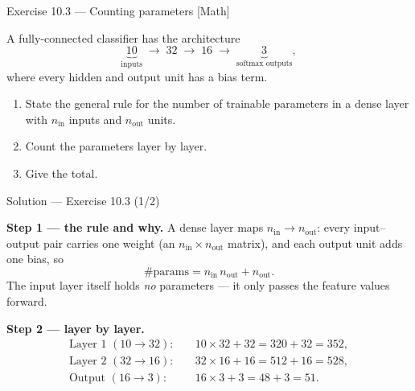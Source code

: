 \documentclass[aspectratio=169,11pt]{beamer}
\begin{document}
\begin{frame}{Exercise 10.3 --- Counting parameters [Math]}
\begin{exercise}
  A fully-connected classifier has the architecture
  \[
    \underbrace{10}_{\text{inputs}}
    \;\rightarrow\; 32 \;\rightarrow\; 16
    \;\rightarrow\; \underbrace{3}_{\text{softmax outputs}},
  \]
  where every hidden and output unit has a bias term.
  \begin{enumerate}
    \item State the general rule for the number of trainable
          parameters in a dense layer with $n_{\text{in}}$ inputs and
          $n_{\text{out}}$ units.
    \item Count the parameters layer by layer.
    \item Give the total.
  \end{enumerate}
\end{exercise}
\end{frame}

\begin{frame}{Solution --- Exercise 10.3 (1/2)}
\begin{solutionbox}
  \textbf{Step 1 --- the rule and why.} A dense layer maps
  $n_{\text{in}} \to n_{\text{out}}$: every input--output pair carries one
  weight (an $n_{\text{in}} \times n_{\text{out}}$ matrix), and each output
  unit adds one bias, so
  \[
    \#\text{params} = n_{\text{in}}\, n_{\text{out}} + n_{\text{out}} .
  \]
  The input layer itself holds \emph{no} parameters --- it only passes the
  feature values forward.

  \medskip
  \textbf{Step 2 --- layer by layer.}
  \[
    \begin{aligned}
      \text{Layer 1 } (10 \to 32): &\quad 10 \times 32 + 32 = 320 + 32 = 352, \\
      \text{Layer 2 } (32 \to 16): &\quad 32 \times 16 + 16 = 512 + 16 = 528, \\
      \text{Output } (16 \to 3):   &\quad 16 \times 3  + 3  = 48  + 3  = 51 .
    \end{aligned}
  \]
\end{solutionbox}
\end{frame}
\end{document}
